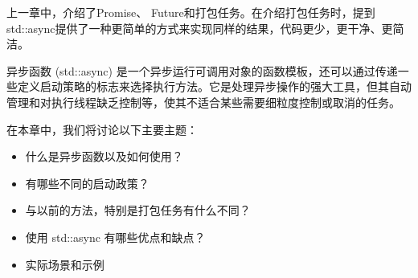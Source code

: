 上一章中，介绍了Promise、 Future和打包任务。在介绍打包任务时，提到std::async提供了一种更简单的方式来实现同样的结果，代码更少，更干净、更简洁。

异步函数 (std::async) 是一个异步运行可调用对象的函数模板，还可以通过传递一些定义启动策略的标志来选择执行方法。它是处理异步操作的强大工具，但其自动管理和对执行线程缺乏控制等，使其不适合某些需要细粒度控制或取消的任务。

在本章中，我们将讨论以下主要主题：

\begin{itemize}
\item
什么是异步函数以及如何使用？

\item
有哪些不同的启动政策？

\item
与以前的方法，特别是打包任务有什么不同？

\item
使用 std::async 有哪些优点和缺点？

\item
实际场景和示例
\end{itemize}